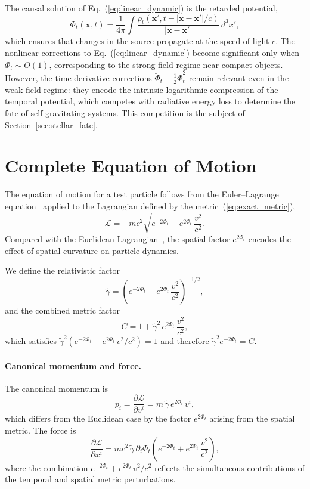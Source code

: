 \documentclass[12pt]{article}
\begin{document}
The causal solution of Eq.~(\ref{eq:linear_dynamic}) is the retarded potential,
\begin{equation}
\Phi_t(\mathbf{x}, t) = \frac{1}{4\pi}\int \frac{\rho_t(\mathbf{x}', t - |\mathbf{x} - \mathbf{x}'|/c)}{|\mathbf{x} - \mathbf{x}'|}\,d^3x',
\label{eq:retarded}
\end{equation}
which ensures that changes in the source propagate at the speed of light $c$. The nonlinear corrections to Eq.~(\ref{eq:linear_dynamic}) become significant only when $\Phi_t \sim O(1)$, corresponding to the strong-field regime near compact objects. However, the time-derivative corrections $\ddot{\Phi}_t + \frac{1}{2}\dot{\Phi}_t^2$ remain relevant even in the weak-field regime: they encode the intrinsic logarithmic compression of the temporal potential, which competes with radiative energy loss to determine the fate of self-gravitating systems. This competition is the subject of Section~\ref{sec:stellar_fate}.


\section{Complete Equation of Motion}
\label{sec:complete_eom}

The equation of motion for a test particle follows from the Euler--Lagrange equation~\cite{Goldstein2002} applied to the Lagrangian defined by the metric~(\ref{eq:exact_metric}),
\begin{equation}
\mathcal{L} = -mc^2\sqrt{e^{-2\Phi_t} - e^{2\Phi_t}\,\frac{v^2}{c^2}}.
\label{eq:lagrangian}
\end{equation}
Compared with the Euclidean Lagrangian~\cite{Gwak2026a}, the spatial factor $e^{2\Phi_t}$ encodes the effect of spatial curvature on particle dynamics.

We define the relativistic factor
$$
\tilde{\gamma} = \left(e^{-2\Phi_t} - e^{2\Phi_t}\,\frac{v^2}{c^2}\right)^{-1/2},
\label{eq:gamma_tilde}
$$
and the combined metric factor
$$
C = 1 + \tilde{\gamma}^2\,e^{2\Phi_t}\,\frac{v^2}{c^2},
\label{eq:C_def}
$$
which satisfies $\tilde{\gamma}^2(e^{-2\Phi_t} - e^{2\Phi_t}\,v^2/c^2) = 1$ and therefore $\tilde{\gamma}^2 e^{-2\Phi_t} = C$.

\paragraph{Canonical momentum and force.}

The canonical momentum is
\begin{equation}
p_i = \frac{\partial\mathcal{L}}{\partial v^i} = m\,\tilde{\gamma}\,e^{2\Phi_t}\,v^i,
\label{eq:momentum}
\end{equation}
which differs from the Euclidean case by the factor $e^{2\Phi_t}$ arising from the spatial metric. The force is
\begin{equation}
\frac{\partial\mathcal{L}}{\partial x^i} = mc^2\,\tilde{\gamma}\,\partial_i\Phi_t\left(e^{-2\Phi_t} + e^{2\Phi_t}\,\frac{v^2}{c^2}\right),
\label{eq:force}
\end{equation}
where the combination $e^{-2\Phi_t} + e^{2\Phi_t}\,v^2/c^2$ reflects the simultaneous contributions of the temporal and spatial metric perturbations.
\end{document}
